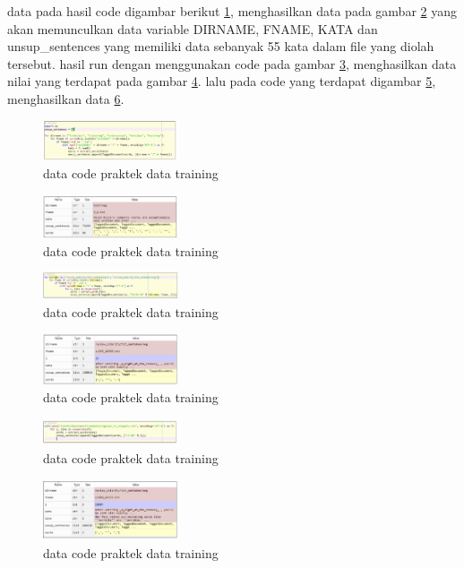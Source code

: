 \begin{enumerate}
        data pada hasil code digambar berikut \ref{l1}, menghasilkan data pada gambar \ref{l2} yang akan memunculkan data variable DIRNAME, FNAME, KATA dan unsup\_sentences yang memiliki data sebanyak 55 kata dalam file yang diolah tersebut. hasil run dengan menggunakan code pada gambar \ref{l3}, menghasilkan data nilai yang terdapat pada gambar \ref{l4}. lalu pada code yang terdapat digambar \ref{l5}, menghasilkan data \ref{l6}.
        \begin{figure}[H]
            \includegraphics[width=4cm]{figures/1174015/5/17.png}
            \centering
            \caption{data code praktek data training }
            \label{l1}
        \end{figure}
        \begin{figure}[H]
            \includegraphics[width=4cm]{figures/1174015/5/18.png}
            \centering
            \caption{data code praktek data training }
            \label{l2}
        \end{figure}
        \begin{figure}[H]
            \includegraphics[width=4cm]{figures/1174015/5/19.png}
            \centering
            \caption{data code praktek data training }
            \label{l3}
        \end{figure}
        \begin{figure}[H]
            \includegraphics[width=4cm]{figures/1174015/5/20.png}
            \centering
            \caption{data code praktek data training }
            \label{l4}
        \end{figure}
        \begin{figure}[H]
            \includegraphics[width=4cm]{figures/1174015/5/21.png}
            \centering
            \caption{data code praktek data training }
            \label{l5}
        \end{figure}
        \begin{figure}[H]
            \includegraphics[width=4cm]{figures/1174015/5/22.png}
            \centering
            \caption{data code praktek data training }
            \label{l6}
        \end{figure}
        

\end{enumerate}

